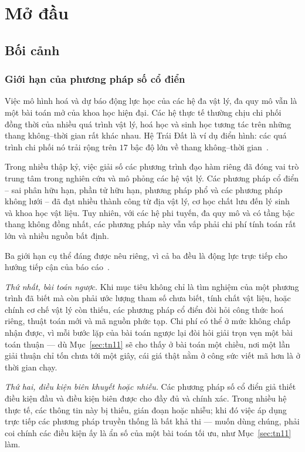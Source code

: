 \chapter{Mở đầu}
\label{chap:modau}
\section{Bối cảnh}
\label{sec:boi-canh}
\subsection{Giới hạn của phương pháp số cổ điển}
\label{subsec:gioi-han-co-dien}
Việc mô hình hoá và dự báo động lực học của các hệ đa vật lý, đa quy mô vẫn là
một bài toán mở của khoa học hiện đại. Các hệ thực tế thường chịu chi phối đồng
thời của nhiều quá trình vật lý, hoá học và sinh học tương tác trên những thang
không--thời gian rất khác nhau. Hệ Trái Đất là ví dụ điển hình: các quá trình chi
phối nó trải rộng trên $17$ bậc độ lớn về thang không--thời
gian~\cite{karniadakis2021}.
 
Trong nhiều thập kỷ, việc giải số các phương trình đạo hàm riêng đã đóng vai trò
trung tâm trong nghiên cứu và mô phỏng các hệ vật lý. Các phương pháp cổ điển --
sai phân hữu hạn, phần tử hữu hạn, phương pháp phổ và các phương pháp không lưới
-- đã đạt nhiều thành công từ địa vật lý, cơ học chất lưu đến lý sinh và khoa học
vật liệu. Tuy nhiên, với các hệ phi tuyến, đa quy mô và có tầng bậc thang không
đồng nhất, các phương pháp này vẫn vấp phải chi phí tính toán rất lớn và nhiều
nguồn bất định.
 
Ba giới hạn cụ thể đáng được nêu riêng, vì cả ba đều là động lực trực tiếp cho
hướng tiếp cận của báo cáo~\cite{karniadakis2021}.
 
\emph{Thứ nhất, bài toán ngược.} Khi mục tiêu không chỉ là tìm nghiệm của một
phương trình đã biết mà còn phải ước lượng tham số chưa biết, tính chất vật liệu,
hoặc chính cơ chế vật lý còn thiếu, các phương pháp cổ điển đòi hỏi công thức hoá
riêng, thuật toán mới và mã nguồn phức tạp. Chi phí có thể ở mức không chấp nhận
được, vì mỗi bước lặp của bài toán ngược lại đòi hỏi giải trọn vẹn một bài toán
thuận --- dù Mục~\ref{sec:tn11} sẽ cho thấy ở bài toán một chiều, nơi một lần giải
thuận chỉ tốn chưa tới một giây, cái giá thật nằm ở công sức viết mã hơn là ở
thời gian chạy.
 
\emph{Thứ hai, điều kiện biên khuyết hoặc nhiễu.} Các phương pháp số cổ điển giả
thiết điều kiện đầu và điều kiện biên được cho đầy đủ và chính xác. Trong nhiều
hệ thực tế, các thông tin này bị thiếu, gián đoạn hoặc nhiễu; khi đó việc áp dụng
trực tiếp các phương pháp truyền thống là bất khả thi --- muốn dùng chúng, phải coi
chính các điều kiện ấy là ẩn số của một bài toán tối ưu, như
Mục~\ref{sec:tn11} làm.
 
